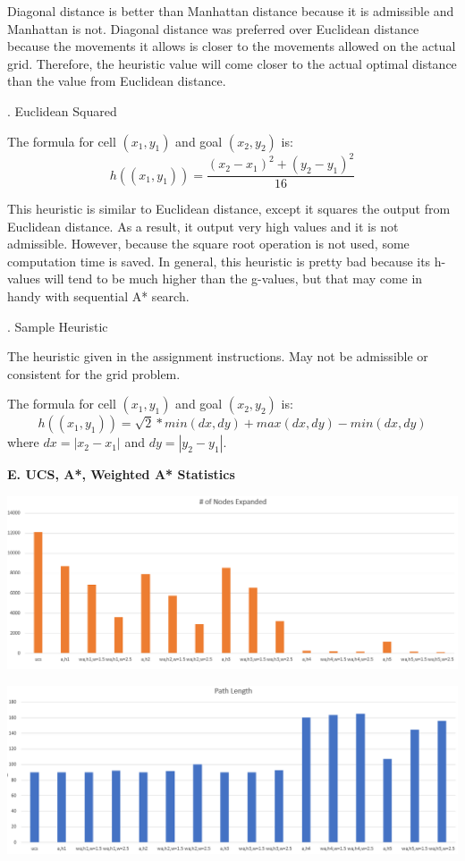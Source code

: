 \documentclass[12pt, letterpaper]{article}
\begin{document}
Diagonal distance is better than Manhattan distance because it is admissible and Manhattan is not. Diagonal distance was preferred over Euclidean distance because the movements it allows is closer to the movements allowed on the actual grid. Therefore, the heuristic value will come closer to the actual optimal distance than the value from Euclidean distance.

\bigskip
{}. Euclidean Squared

The formula for cell $(x_1, y_1)$ and goal $(x_2, y_2)$ is:
$$h((x_1,y_1)) = \frac{(x_2-x_1)^2 + (y_2-y_1)^2}{16}$$

This heuristic is similar to Euclidean distance, except it squares the output from Euclidean distance. As a result, it output very high values and it is not admissible. However, because the square root operation is not used, some computation time is saved. In general, this heuristic is pretty bad because its h-values will tend to be much higher than the g-values, but that may come in handy with sequential A* search.

\bigskip
{}. Sample Heuristic

The heuristic given in the assignment instructions. May not be admissible or consistent for the grid problem. 

The formula for cell $(x_1, y_1)$ and goal $(x_2, y_2)$ is:
$$h((x_1,y_1)) = \sqrt{2} * min(dx, dy) + max(dx, dy) - min(dx, dy)$$
where $dx = |x_2 - x_1|$ and $dy = |y_2 - y_1|$. 

\pagebreak %

\noindent \textbf{E. UCS, A*, Weighted A* Statistics}

\noindent \includegraphics[scale=0.65]{"avg-nodeexpanded"}

\medskip

\noindent \includegraphics[scale=0.65]{"avg-pathlength"}
\end{document}
